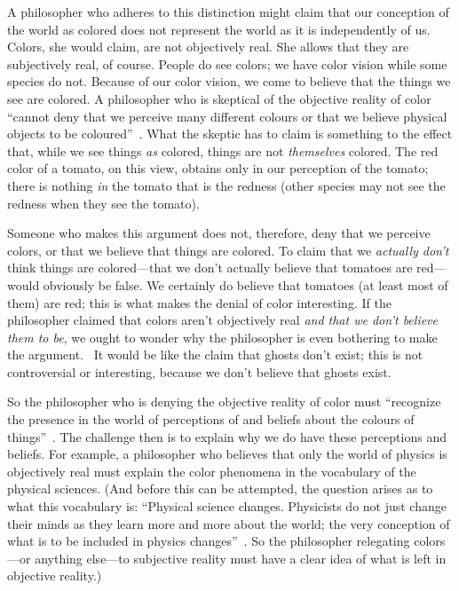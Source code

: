 \documentclass[11pt]{standalone}
\begin{document}
\begin{spacing}{1.5}
A philosopher who adheres to this distinction might claim that our
conception of the world as colored does not represent the world as it
is independently of us.  Colors, she would claim, are not objectively
real.  She allows that they are subjectively real, of course.  People
do see colors; we have color vision while some species do not.
Because of our color vision, we come to believe that the things we see
are colored.  A philosopher who is skeptical of the objective reality
of color ``cannot deny that we perceive many different colours or that
we believe physical objects to be coloured''~\citep[145]{stroud2000a}.
What the skeptic has to claim is something to the effect that, while
we see things {\em as} colored, things are not {\em themselves}
colored.  The red color of a tomato, on this view, obtains only in our
perception of the tomato; there is nothing {\em in} the tomato that
is the redness (other species may not see the redness when they see
the tomato).
%

Someone who makes this argument does not, therefore, deny that we
perceive colors, or that we believe that things are colored.  To claim
that we {\em actually don't} think things are colored---that we don't
actually believe that tomatoes are red---would obviously be false.  We
certainly do believe that tomatoes (at least most of them) are red;
this is what makes the denial of color interesting.  If the
philosopher claimed that colors aren't objectively real {\em and that
  we don't believe them to be}, we ought to wonder why the philosopher
is even bothering to make the argument.
%
%
\ It would be like the claim that ghosts don't exist; this is not
controversial or interesting, because we don't believe that ghosts
exist.

So the philosopher who is denying the objective reality of color must
``recognize the presence in the world of perceptions of and beliefs
about the colours of things''~\citep[199]{stroud2000a}.  The challenge
then is to explain why we do have these perceptions and beliefs.  For
example, a philosopher who believes that only the world of physics is
objectively real must explain the color phenomena in the vocabulary of
the physical sciences.  (And before this can be attempted, the
question arises as to what this vocabulary is: ``Physical science
changes.  Physicists do not just change their minds as they learn more
and more about the world; the very conception of what is to be
included in physics changes''~\citep[53]{stroud2000a}.  So the
philosopher relegating colors---or anything else---to subjective
reality must have a clear idea of what is left in objective reality.)


\end{spacing}
\end{document}
